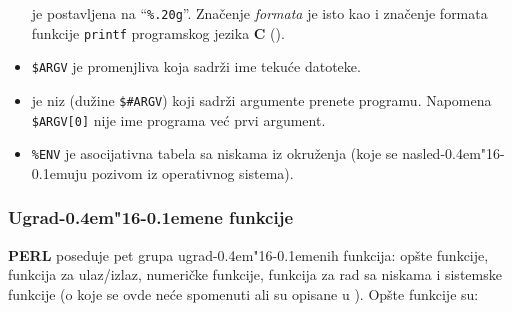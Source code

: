 \documentclass[12pt,a4paper]{article}
\def\d{d\kern-0.4em\char"16\kern-0.1em}
\begin{document}
\begin{itemize}
          je postavljena na ``{\tt\%.20g}''.
          Zna\v cenje {\it formata} je isto kao i zna\v cenje formata funkcije
          {\tt printf} programskog jezika {\bf C} (\cite{KR,PERL}).
        \item
          {\tt\$ARGV} je promenjliva koja sadr\v zi ime teku\'ce datoteke.
        \item
          {\tt@ARGV} je niz (du\v zine {\tt\$\#ARGV}) koji sadr\v zi argumente
          prenete programu.
          Napomena {\tt\$ARGV[0]} nije ime programa ve\'c prvi argument.
        \item
          {\tt\%ENV} je asocijativna tabela sa niskama iz okru\v zenja (koje
          se nasle\d uju pozivom iz operativnog sistema).
        \end{itemize}
%
      \subsubsection{Ugra\d ene funkcije}
        {\bf PERL} poseduje pet grupa ugra\d enih funkcija: op\v ste
        funkcije, funkcija za ulaz/izlaz, numeri\v cke funkcije, funkcija za
        rad sa niskama i sistemske funkcije (o koje se ovde ne\'ce spomenuti
        ali su opisane u \cite{PERL}).
        Op\v ste funkcije su:
\end{document}
